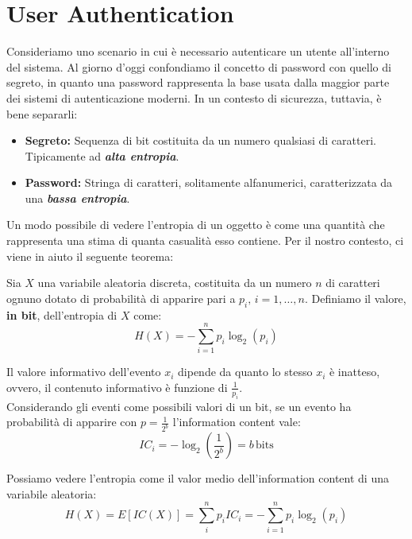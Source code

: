 \chapter{User Authentication}
Consideriamo uno scenario in cui è necessario autenticare un utente all'interno del sistema. Al giorno d'oggi confondiamo il concetto di password con quello di segreto, in quanto una password rappresenta la base usata dalla maggior parte dei sistemi di autenticazione moderni. In un contesto di sicurezza, tuttavia, è bene separarli:
\begin{itemize}
    \item \textbf{Segreto:} Sequenza di bit costituita da un numero qualsiasi di caratteri. Tipicamente ad \textit{\textbf{alta entropia}}.
    \item \textbf{Password:} Stringa di caratteri, solitamente alfanumerici, caratterizzata da una \textbf{\textit{bassa entropia}}.
\end{itemize}
Un modo possibile di vedere l'entropia di un oggetto è come una quantità che rappresenta una stima di quanta casualità esso contiene. Per il nostro contesto, ci viene in aiuto il seguente teorema:
\begin{theorem}\label{thm:shannonentropy}
Sia $X$ una variabile aleatoria discreta, costituita da un numero $n$ di caratteri ognuno dotato di probabilità di apparire pari a $p_i,\,i=1,\dots,n$. Definiamo il valore, \textbf{in bit}, dell'entropia di $X$ come:
\begin{equation}\label{eq:entropy}
H(X)=-\sum_{i=1}^{n}p_i\log_{2}\left(p_i\right)
\end{equation}
\end{theorem}
\begin{proposition}
Il valore informativo dell'evento $x_i$ dipende da quanto lo stesso $x_i$ è inatteso, ovvero, il contenuto informativo è funzione di $\frac{1}{p_i}$.\\
Considerando gli eventi come possibili valori di un bit, se un evento ha probabilità di apparire con $p=\frac{1}{2^b}$ l'information content vale: 
\begin{equation}
    IC_i=-\log_{2}\left(\frac{1}{2^b}\right)=b \,\text{bits}
\end{equation}
\end{proposition}
\begin{corollary}
Possiamo vedere l'entropia come il valor medio dell'information content di una variabile aleatoria: 
\begin{equation}
    H(X)=E[IC(X)]=\sum_{i}^{n}p_i IC_i=-\sum_{i=1}^{n}p_i\log_{2}\left(p_i\right)
\end{equation}
\end{corollary}
